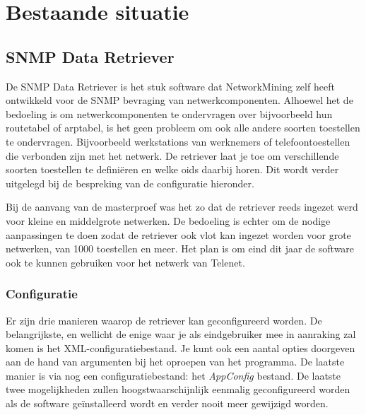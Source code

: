 \chapter{Bestaande situatie}

\section{SNMP Data Retriever}
De SNMP Data Retriever is het stuk software dat NetworkMining zelf heeft ontwikkeld voor de SNMP bevraging van netwerkcomponenten.
Alhoewel het de bedoeling is om netwerkcomponenten te ondervragen over bijvoorbeeld hun routetabel of \gls{arptabel},
is het geen probleem om ook alle andere soorten toestellen te ondervragen. Bijvoorbeeld werkstations van werknemers of
telefoontoestellen die verbonden zijn met het netwerk. De retriever laat je toe om verschillende soorten toestellen te
definiëren en welke \glspl{oid} daarbij horen. Dit wordt verder uitgelegd bij de bespreking van de configuratie hieronder.

Bij de aanvang van de masterproef was het zo dat de retriever reeds ingezet werd voor kleine en middelgrote netwerken.
De bedoeling is echter om de nodige aanpassingen te doen zodat de retriever ook vlot kan ingezet worden voor grote netwerken,
van 1000 toestellen en meer. Het plan is om eind dit jaar de software ook te kunnen gebruiken voor het netwerk van Telenet. 


\subsection{Configuratie}
Er zijn drie manieren waarop de retriever kan geconfigureerd worden. De belangrijkste,
en wellicht de enige waar je als eindgebruiker mee in aanraking zal komen is het XML-configuratiebestand.
Je kunt ook een aantal opties doorgeven aan de hand van argumenten bij het oproepen van het programma.
De laatste manier is via nog een configuratiebestand: het \emph{AppConfig} bestand. De laatste twee mogelijkheden
zullen hoogstwaarschijnlijk eenmalig geconfigureerd worden als de software geïnstalleerd wordt en verder nooit meer gewijzigd worden.

